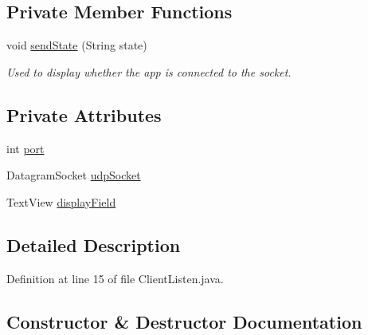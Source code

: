 \subsection*{Private Member Functions}
\begin{DoxyCompactItemize}
\item 
void \mbox{\hyperlink{classcom_1_1example_1_1trainawearapplication_1_1_client_listen_ab1d26a5c46561734eef258d64a6d7723}{send\+State}} (String state)
\begin{DoxyCompactList}\small\item\em Used to display whether the app is connected to the socket. \end{DoxyCompactList}\end{DoxyCompactItemize}
\subsection*{Private Attributes}
\begin{DoxyCompactItemize}
\item 
int \mbox{\hyperlink{classcom_1_1example_1_1trainawearapplication_1_1_client_listen_a9835e7e202b86f8b019671b86508313a}{port}}
\item 
Datagram\+Socket \mbox{\hyperlink{classcom_1_1example_1_1trainawearapplication_1_1_client_listen_a008375f58e870216d43730ef43964b61}{udp\+Socket}}
\item 
Text\+View \mbox{\hyperlink{classcom_1_1example_1_1trainawearapplication_1_1_client_listen_a832fe2d0515add95ba938249831116bc}{display\+Field}}
\end{DoxyCompactItemize}


\subsection{Detailed Description}


Definition at line 15 of file Client\+Listen.\+java.



\subsection{Constructor \& Destructor Documentation}
\mbox{\label{classcom_1_1example_1_1trainawearapplication_1_1_client_listen_a24ac2c031ded11c7a5ce64dae1694253}} 
